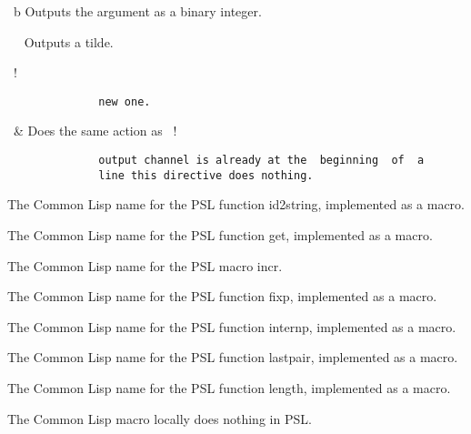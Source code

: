 ~b            Outputs the argument as a binary integer.

~~            Outputs a tilde.

~!%
\begin{verbatim}
              new one.
\end{verbatim}
~&            Does  the  same action as ~!%
\begin{verbatim}
              output channel is already at the  beginning  of  a
              line this directive does nothing.
\end{verbatim}


{}

{}

{}

{    The  Common  Lisp  name  for  the  PSL  function  id2string,
    implemented as a macro.
}

{    The Common Lisp name for the PSL function  get,  implemented
    as a macro.
}

{    The Common Lisp name for the PSL macro incr.
}

{    The  Common Lisp name for the PSL function fixp, implemented
    as a macro.
}

{    The  Common  Lisp  name  for  the  PSL   function   internp,
    implemented as a macro.
}

{    The   Common  Lisp  name  for  the  PSL  function  lastpair,
    implemented as a macro.
}

{    The  Common  Lisp  name  for  the   PSL   function   length,
    implemented as a macro.
}

{}

{    The Common Lisp macro locally does nothing in PSL.
}

{}

{}

